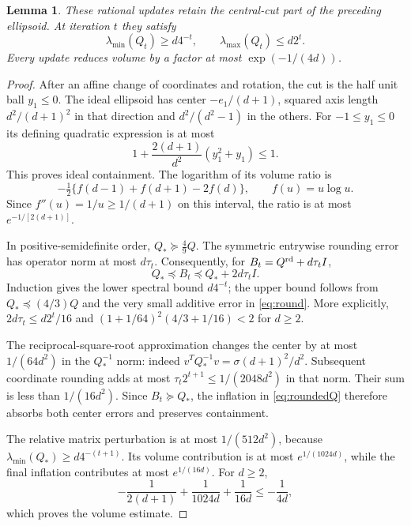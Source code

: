 \documentclass[11pt]{article}
\newtheorem{lemma}[theorem]{Lemma}
\theoremstyle{remark}\newtheorem{remark}[theorem]{Remark}
\begin{document}
\begin{lemma}\label{lem:round}
These rational updates retain the central-cut part of the preceding ellipsoid. At iteration $t$ they satisfy
\[
 \lambda_{\min}(Q_t)\ge d4^{-t},\qquad
 \lambda_{\max}(Q_t)\le d2^t.
\]
Every update reduces volume by a factor at most $\exp(-1/(4d))$.
\end{lemma}
\begin{proof}
After an affine change of coordinates and rotation, the cut is the half unit ball $y_1\le0$. The ideal ellipsoid has center $-e_1/(d+1)$, squared axis length $d^2/(d+1)^2$ in that direction and $d^2/(d^2-1)$ in the others. For $-1\le y_1\le0$ its defining quadratic expression is at most
\[
 1+\frac{2(d+1)}{d^2}(y_1^2+y_1)\le1.
\]
This proves ideal containment. The logarithm of its volume ratio is
\[
 -\tfrac12\{f(d-1)+f(d+1)-2f(d)\},\qquad f(u)=u\log u.
\]
Since $f''(u)=1/u\ge1/(d+1)$ on this interval, the ratio is at most $e^{-1/[2(d+1)]}$.

In positive-semidefinite order, $Q_*\succeq\frac49Q$. The symmetric entrywise rounding error has operator norm at most $d\tau_t$. Consequently, for $B_t=Q^{\rm rd}+d\tau_t I$,
\[
 Q_*\preceq B_t\preceq Q_*+2d\tau_t I.
\]
Induction gives the lower spectral bound $d4^{-t}$; the upper bound follows from $Q_*\preceq(4/3)Q$ and the very small additive error in \eqref{eq:round}. More explicitly, $2d\tau_t\le d2^t/16$ and $(1+1/64)^2(4/3+1/16)<2$ for $d\ge2$.

The reciprocal-square-root approximation changes the center by at most $1/(64d^2)$ in the $Q_*^{-1}$ norm: indeed $v^TQ_*^{-1}v=\sigma(d+1)^2/d^2$. Subsequent coordinate rounding adds at most $\tau_t2^{t+1}\le1/(2048d^2)$ in that norm. Their sum is less than $1/(16d^2)$. Since $B_t\succeq Q_*$, the inflation in \eqref{eq:roundedQ} therefore absorbs both center errors and preserves containment.

The relative matrix perturbation is at most $1/(512d^2)$, because $\lambda_{\min}(Q_*)\ge d4^{-(t+1)}$. Its volume contribution is at most $e^{1/(1024d)}$, while the final inflation contributes at most $e^{1/(16d)}$. For $d\ge2$,
\[
 -\frac1{2(d+1)}+\frac1{1024d}+\frac1{16d}\le-\frac1{4d},
\]
which proves the volume estimate.
\end{proof}
\end{document}
